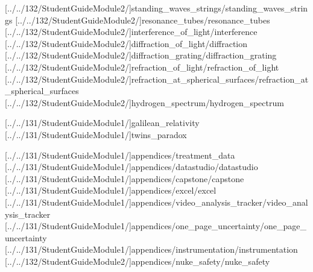 \documentclass[english,twoside]{article}
\begin{document}
[../../132/StudentGuideModule2/]{standing_waves_strings/standing_waves_strings} %
[../../132/StudentGuideModule2/]{resonance_tubes/resonance_tubes} 
[../../132/StudentGuideModule2/]{interference_of_light/interference}
[../../132/StudentGuideModule2/]{diffraction_of_light/diffraction}
[../../132/StudentGuideModule2/]{diffraction_grating/diffraction_grating}
[../../132/StudentGuideModule2/]{refraction_of_light/refraction_of_light}
[../../132/StudentGuideModule2/]{refraction_at_spherical_surfaces/refraction_at_spherical_surfaces}
[../../132/StudentGuideModule2/]{hydrogen_spectrum/hydrogen_spectrum}


[../../131/StudentGuideModule1/]{galilean_relativity}
[../../131/StudentGuideModule1/]{twins_paradox}

\appendix
{} %
\cleardoublepage
\NoForceSectionOddPage %
\renewcommand{\headersupplementmark}{Appendix }
\titleformat{\section}{\normalfont\large\bfseries}{\headersupplementmark \thesection :}{1ex}{}

[../../131/StudentGuideModule1/]{appendices/treatment_data}
[../../131/StudentGuideModule1/]{appendices/datastudio/datastudio}
[../../131/StudentGuideModule1/]{appendices/capstone/capstone}
[../../131/StudentGuideModule1/]{appendices/excel/excel}
[../../131/StudentGuideModule1/]{appendices/video_analysis_tracker/video_analysis_tracker}
[../../131/StudentGuideModule1/]{appendices/one_page_uncertainty/one_page_uncertainty}
[../../131/StudentGuideModule1/]{appendices/instrumentation/instrumentation}
[../../132/StudentGuideModule2/]{appendices/nuke_safety/nuke_safety}
\end{document}
